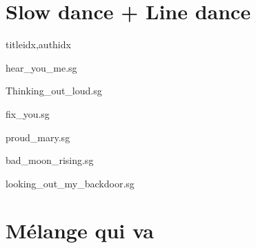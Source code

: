 \documentclass[
    ]{article}
\begin{document}
\section{Slow dance + Line dance}

\begin{songs}{titleidx,authidx}

{hear_you_me.sg}


{Thinking_out_loud.sg}


{fix_you.sg}


{proud_mary.sg}


{bad_moon_rising.sg}


{looking_out_my_backdoor.sg}

\end{songs}

\section{Mélange qui va}
\end{document}
